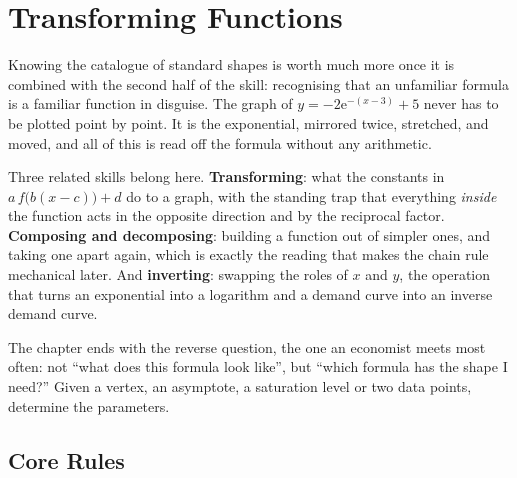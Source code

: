 \chapter{Transforming Functions}

Knowing the catalogue of standard shapes is worth much more once it is
combined with the second half of the skill: recognising that an unfamiliar
formula is a familiar function in disguise. The graph of
$y=-2\mathrm{e}^{-(x-3)}+5$ never has to be plotted point by point. It is
the exponential, mirrored twice, stretched, and moved, and all of this is
read off the formula without any arithmetic.

Three related skills belong here. \textbf{Transforming}: what the constants
in $a\,f\bigl(b(x-c)\bigr)+d$ do to a graph, with the standing trap that
everything \emph{inside} the function acts in the opposite direction and by
the reciprocal factor. \textbf{Composing and decomposing}: building a
function out of simpler ones, and taking one apart again, which is exactly
the reading that makes the chain rule mechanical later. And
\textbf{inverting}: swapping the roles of $x$ and $y$, the operation that
turns an exponential into a logarithm and a demand curve into an inverse
demand curve.

The chapter ends with the reverse question, the one an economist meets
most often: not ``what does this formula look like'', but ``which formula has
the shape I need?'' Given a vertex, an asymptote, a saturation level or two
data points, determine the parameters.

\section{Core Rules}

